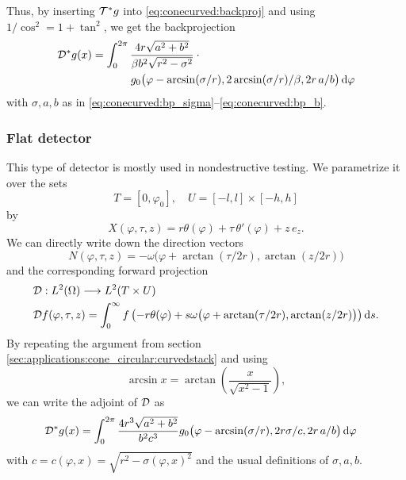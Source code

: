 \documentclass{amsart}
\renewcommand*{\phi}{\varphi}
\begin{document}
%
Thus, by inserting ${{\mathcal{T}}^*} g$ into \eqref{eq:conecurved:backproj} and using $1/\cos^2 = 1 + \tan^2$, we get the backprojection
%
\begin{align}
 \label{eq:conestack:backproj}
 \DUALOPD g(x)
 &= \int_0^{2\pi} \frac{4r \sqrt{a^2 + b^2}}{\beta b^2 \sqrt{r^2 - \sigma^2}} \cdot \phantom{x} \\
 &\hspace{35pt} g_0 \big( \phi - \arcsin(\sigma/r), 2\arcsin(\sigma/r)/\beta, 2r\, a/b \big)\, \D\phi \notag
\end{align}
%
with $\sigma, a, b$ as in \eqref{eq:conecurved:bp_sigma}--\eqref{eq:conecurved:bp_b}.
\vspace{5ex}%




\subsubsection{Flat detector}
\label{sec:applications:cone_circular:flat}

This type of detector is mostly used in nondestructive testing. We parametrize it over the sets
%
\begin{equation}
 \label{eq:coneflat:params}
 T = [0, \phi_0], \quad U = [-l, l] \times [-h, h]
\end{equation}
%
by
%
\begin{equation}
 \label{eq:coneflat:detector_parametr}
 X(\phi, \tau, z) = r\theta(\phi) + \tau\, \theta'(\phi) + z\, e_z.
\end{equation} 
%
We can directly write down the direction vectors
%
\begin{equation}
 \label{eq:coneflat:direction_field}
 N(\phi, \tau, z) = - \omega\big(\phi + \arctan(\tau/2r), \arctan(z/2r)\big)
\end{equation}
%
and the corresponding forward projection
%
\begin{align*}
 &\OPD: L^2(\Omega) \Lto L^2(T \times U) \\
 \label{eq:coneflat:fwdproj}
 &\OPD f(\phi, \tau, z) = \int_0^\infty f\left( -r\theta(\phi) + s \omega\big(\phi + \arctan(\tau/2r), \arctan(z/2r)\big) \right) \D s.
\end{align*}
%
By repeating the argument from section \ref{sec:applications:cone_circular:curvedstack} and using
%
\begin{equation*}
 \arcsin x = \arctan\left( \frac{x}{\sqrt{x^2 - 1}} \right),
\end{equation*}
%
we can write the adjoint of ${\mathcal{D}}$ as
%
\begin{align}
 \label{eq:conestack:backproj}
 \DUALOPD g(x)
 &= \int_0^{2\pi} \frac{4r^3 \sqrt{a^2 + b^2}}{b^2 c^3} g_0 \big( \phi - \arcsin(\sigma/r), 2r \sigma/c, 2r\, a/b \big)\, \D\phi \notag
\end{align}
%
with $c = c(\phi, x) = \sqrt{r^2 - \sigma(\phi, x)^2}$ and the usual definitions of $\sigma, a, b$.
\vspace{5ex}%
\end{document}
